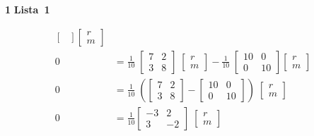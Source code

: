 \documentclass{article}
\newcounter{exe-list}
\newenvironment{exe-list}
    {\begin{list}{(\alph{exe-list})}{\usecounter{exe-list}}}
    {\end{list}}
\newenvironment{exe}[2][Sala]
    {\bigskip\noindent\par\ifthenelse{\equal{#1}{}}%
        {\textbf{\LARGE #2}}%
        {\textbf{\LARGE #1~#2}}%
    \medskip\noindent\par}
    {\bigskip}
\begin{document}
\begin{exe}[Lista]{1}
\begin{exe-list}
\begin{align*}
\begin{bmatrix}
                    \end{bmatrix} \begin{bmatrix}
                        r \\ m
                    \end{bmatrix} \\
                0 &= \frac{1}{10} \; \begin{bmatrix}
                        7 & 2 \\
                        3 & 8
                    \end{bmatrix} \; \begin{bmatrix}
                        r \\ m
                    \end{bmatrix} - \frac{1}{10} \; \begin{bmatrix}
                        10 & 0 \\
                        0 & 10
                    \end{bmatrix} \begin{bmatrix}
                        r \\ m
                    \end{bmatrix} \\
                0 &= \frac{1}{10} \; \left(
                    \begin{bmatrix}
                        7 & 2 \\
                        3 & 8
                    \end{bmatrix} - \begin{bmatrix}
                        10 & 0 \\
                        0 & 10
                    \end{bmatrix}
                    \right) \; \begin{bmatrix}
                        r \\ m
                    \end{bmatrix} \\
                0 &= \frac{1}{10} \begin{bmatrix}
                        -3 & 2 \\
                        3 & -2
                    \end{bmatrix}
                    \; \begin{bmatrix}
                        r \\ m
                    \end{bmatrix} \\

\end{align*}
\end{exe-list}
\end{exe}
\end{document}
